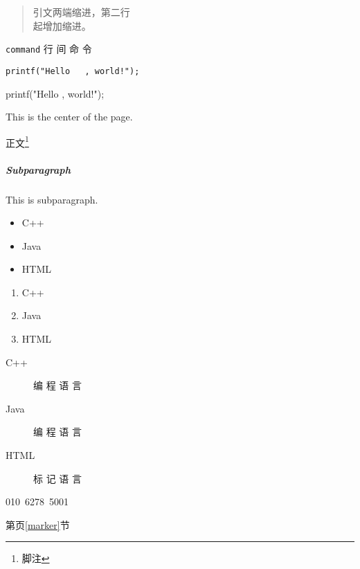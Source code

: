 \documentclass{article}
\begin{document}
\begin{verse}
引文两端缩进，第二行\\起增加缩进。
\end{verse}

\verb|command| 行 间 命 令
\begin{verbatim}
printf("Hello   , world!");
\end{verbatim}
\begin{verbatim*} 
printf("Hello   , world!"); 
\end{verbatim*}

\begin{center}
    This is the center of the page.
\end{center}

正文\footnote{脚注}

\reversemarginpar
{}
\normalmarginpar

\subparagraph{Subparagraph} 
This is subparagraph.

\begin{itemize}
    \item C++
    \item Java
    \item HTML
\end{itemize}

\begin{enumerate}
    \item C++
    \item Java
    \item HTML
\end{enumerate}

\begin{description}
    \item[C++] 编 程 语 言
    \item[Java] 编 程 语 言
    \item[HTML] 标 记 语 言
\end{description}

\newpage
\mbox{010 6278 5001}





\hfill




第\pageref{marker}页\ref{marker}节
\end{document}
